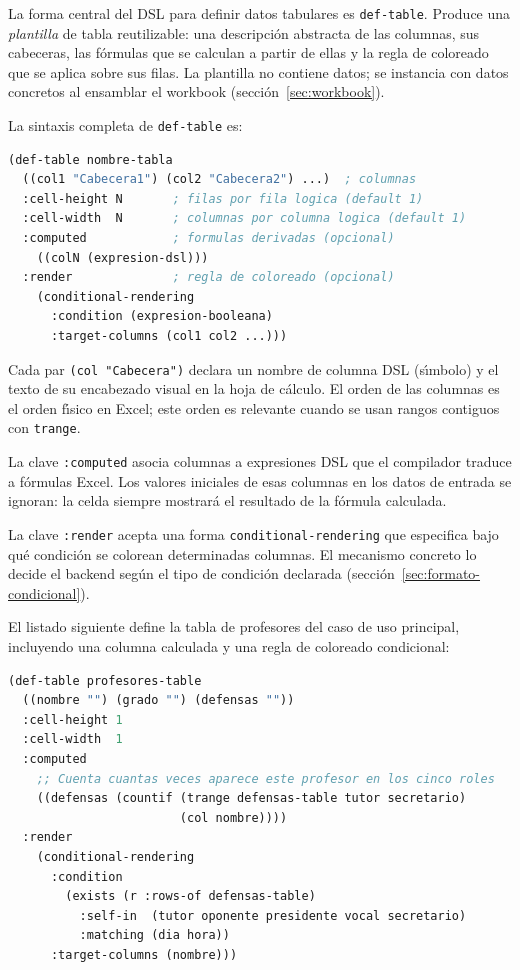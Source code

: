 \documentclass[12pt,a4paper]{report}
\begin{document}
La forma central del DSL para definir datos tabulares es \texttt{def-table}.
Produce una \emph{plantilla} de tabla reutilizable: una descripci\'on
abstracta de las columnas, sus cabeceras, las f\'ormulas que se calculan a
partir de ellas y la regla de coloreado que se aplica sobre sus filas.  La
plantilla no contiene datos; se instancia con datos concretos al ensamblar
el workbook (secci\'on~\ref{sec:workbook}).

La sintaxis completa de \texttt{def-table} es:

\begin{lstlisting}[language=CommonLisp,
  caption={Sintaxis completa de def-table.}]
(def-table nombre-tabla
  ((col1 "Cabecera1") (col2 "Cabecera2") ...)  ; columnas
  :cell-height N       ; filas por fila logica (default 1)
  :cell-width  N       ; columnas por columna logica (default 1)
  :computed            ; formulas derivadas (opcional)
    ((colN (expresion-dsl)))
  :render              ; regla de coloreado (opcional)
    (conditional-rendering
      :condition (expresion-booleana)
      :target-columns (col1 col2 ...)))
\end{lstlisting}

Cada par \texttt{(col "Cabecera")} declara un nombre de columna DSL
(s\'{\i}mbolo) y el texto de su encabezado visual en la hoja de c\'alculo.
El orden de las columnas es el orden f\'{\i}sico en Excel; este orden es
relevante cuando se usan rangos contiguos con \texttt{trange}.

La clave \texttt{:computed} asocia columnas a expresiones DSL que el
compilador traduce a f\'ormulas Excel.  Los valores iniciales de esas
columnas en los datos de entrada se ignoran: la celda siempre mostrar\'a el
resultado de la f\'ormula calculada.

La clave \texttt{:render} acepta una forma \texttt{conditional-rendering}
que especifica bajo qu\'e condici\'on se colorean determinadas columnas.
El mecanismo concreto lo decide el backend seg\'un el tipo de condici\'on
declarada (secci\'on~\ref{sec:formato-condicional}).

El listado siguiente define la tabla de profesores del caso de uso
principal, incluyendo una columna calculada y una regla de coloreado
condicional:

\begin{lstlisting}[language=CommonLisp,
  caption={Tabla de profesores con columna computed y regla de coloreado.}]
(def-table profesores-table
  ((nombre "") (grado "") (defensas ""))
  :cell-height 1
  :cell-width  1
  :computed
    ;; Cuenta cuantas veces aparece este profesor en los cinco roles
    ((defensas (countif (trange defensas-table tutor secretario)
                        (col nombre))))
  :render
    (conditional-rendering
      :condition
        (exists (r :rows-of defensas-table)
          :self-in  (tutor oponente presidente vocal secretario)
          :matching (dia hora))
      :target-columns (nombre)))
\end{lstlisting}
\end{document}
